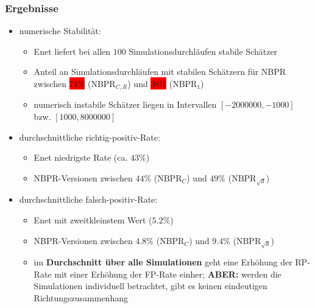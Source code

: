 \documentclass{beamer}
\begin{document}
\begin{frame}
	\frametitle{Ergebnisse}
	\begin{itemize}
	\item numerische Stabilität:
	\begin{itemize}
	\item Enet liefert bei allen $100$ Simulationsdurchläufen stabile Schätzer
	\item Anteil an Simulationsdurchläufen mit stabilen Schätzern für NBPR zwischen \colorbox{red}{$74\%$} ($\text{NBPR}_{C,R}$) und \colorbox{red}{$38\%$} ($\text{NBPR}_{1}$)
	\item numerisch instabile Schätzer liegen in Intervallen $[-2000000,-1000]$ bzw. $[1000,8000000]$
	\end{itemize}
	\item durchschnittliche richtig-positiv-Rate:
	\begin{itemize}
	\item Enet niedrigste Rate (ca. $43\%$)
	\item NBPR-Versionen zwischen $44\%$ ($\text{NBPR}_{C}$) und $49\%$ ($\text{NBPR}_{\sqrt{d}}$)
	\end{itemize}
	\end{itemize}
\end{frame}


\begin{frame}
	\begin{itemize}
	\item durchschnittliche falsch-positiv-Rate:
	\begin{itemize}
	\item Enet mit zweitkleinstem Wert ($5.2\%$)
	\item NBPR-Versionen zwischen $4.8\%$ ($\text{NBPR}_{C}$) und $9.4\%$ ($\text{NBPR}_{\sqrt{d}}$)
	\item im \textbf{Durchschnitt über alle Simulationen} geht eine Erhöhung der RP-Rate mit einer Erhöhung der FP-Rate einher; \textbf{ABER:} werden die Simulationen individuell betrachtet, gibt es keinen eindeutigen Richtungszusammenhang  
	\end{itemize}
	\end{itemize}
\end{frame}
\end{document}
